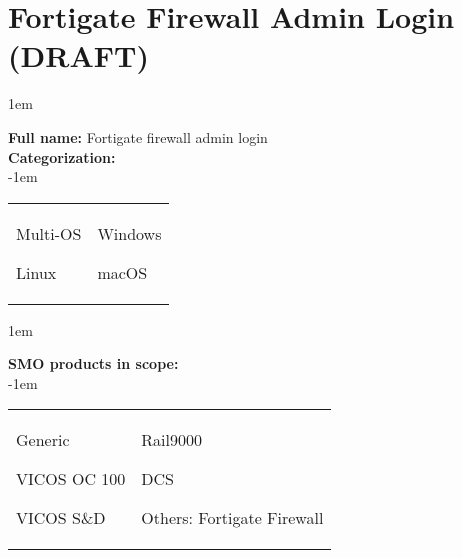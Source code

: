 
%
%

\section{Fortigate Firewall Admin Login (DRAFT)}
\label{15800}

\openup 1em

\textbf{Full name:} Fortigate firewall admin login \hrulefill \\
{\bf Categorization:} \\

\openup -1em
\vspace{-3em}

\begin{tabular}{p{}p{}}

\begin{todolist}
  	\item Multi-OS
	\item Linux
\end{todolist}
&
\begin{todolist}
	\item Windows
	\item macOS
\end{todolist}

\end{tabular}

\openup 1em

{\bf SMO products in scope:} \\

\openup -1em
\vspace{-3em}

\begin{tabular}{p{}p{}}

\begin{todolist}
  \item Generic
  \item VICOS OC 100
  \item VICOS S\&D
\end{todolist}
&
\begin{todolist}
  \item Rail9000
  \item[\done] DCS
  \item Others: Fortigate Firewall\hrulefill
\end{todolist}

\end{tabular}

